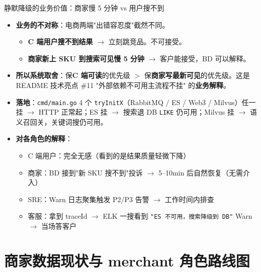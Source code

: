 \documentclass[aspectratio=169,11pt]{beamer}
\begin{document}
\begin{frame}[shrink]{静默降级的业务价值：商家慢 5 分钟 vs 用户搜不到}
\begin{itemize}
  \item \textbf{业务的不对称}：电商两端"出错容忍度"截然不同。
  \begin{itemize}
    \item \textbf{C 端用户搜不到结果} $\to$ 立刻跳竞品。不可接受。
    \item \textbf{商家新上 SKU 到搜索可见慢 5 分钟} $\to$ 客户能接受，BD 可以解释。
  \end{itemize}
  \item \textbf{所以系统取舍}：保\textbf{C 端可读}的优先级 $>$ 保\textbf{商家写最新可见}的优先级。这是 README 技术亮点 \#11 "外部依赖不可用主流程不挂" 的\textbf{业务解释}。
  \item \textbf{落地}：\texttt{cmd/main.go} 4 个 \texttt{tryInitX}（RabbitMQ / ES / Web3 / Milvus）任一挂 $\to$ HTTP 正常起；ES 挂 $\to$ 搜索退 DB \texttt{LIKE} 仍可用；Milvus 挂 $\to$ 语义召回关，关键词搜仍可用。
  \item \textbf{对各角色的解释}：
  \begin{itemize}
    \item C 端用户：完全无感（看到的是结果质量轻微下降）
    \item 商家：BD 接到"新 SKU 搜不到"投诉 $\to$ 5--10min 后自然恢复（无需介入）
    \item SRE：Warn 日志聚集触发 P2/P3 告警 $\to$ 工作时间内排查
    \item 客服：拿到 traceId $\to$ ELK 一搜看到 \texttt{"ES 不可用，搜索降级到 DB"} Warn $\to$ 当场答客户
  \end{itemize}
\end{itemize}
\end{frame}

\section{商家数据现状与 merchant 角色路线图}
\end{document}
